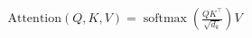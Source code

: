 \documentclass[preview]{standalone}
\begin{document}
\begin{align*}
\mathrm{Attention}(Q,K,V) = \operatorname{softmax}\!\left(\frac{QK^\top}{\sqrt{d_k}}\right) V
\end{align*}
\end{document}
